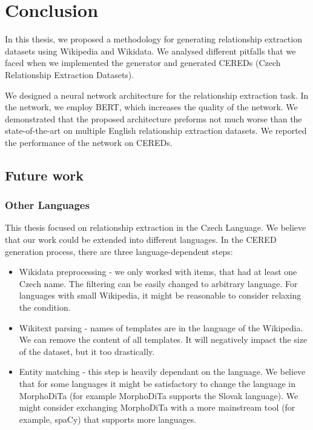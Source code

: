 \chapter*{Conclusion}
In this thesis, we proposed a methodology for generating relationship extraction datasets using Wikipedia and Wikidata. We analysed different pitfalls that we faced when we implemented the generator and generated CEREDs (Czech Relationship Extraction Datasets). 

We designed a neural network architecture for the relationship extraction task. In the network, we employ BERT, which increases the quality of the network. We demonstrated that the proposed architecture preforms not much worse than the state-of-the-art on multiple English relationship extraction datasets. We reported the performance of the network on CEREDs.


\section{Future work}

\subsection{Other Languages}

This thesis focused on relationship extraction in the Czech  Language. We believe that our work could be extended into different languages. In the CERED generation process, there are three language-dependent steps:
\begin{itemize}
\item Wikidata preprocessing - we only worked with items, that had at least one Czech name. The filtering can be easily changed to arbitrary language. For languages with small Wikipedia, it might be reasonable to consider relaxing the condition.
\item Wikitext parsing - names of templates are in the language of the Wikipedia. We can remove the content of all templates. It will negatively impact the size of the dataset, but it too drastically.
\item Entity matching - this step is heavily dependant on the language. We believe that for some languages it might be satisfactory to change the language in MorphoDiTa (for example MorphoDiTa supports the Slovak language). We might consider exchanging MorphoDiTa with a more mainstream tool (for example, spaCy) that supports more languages.

\end{itemize}

